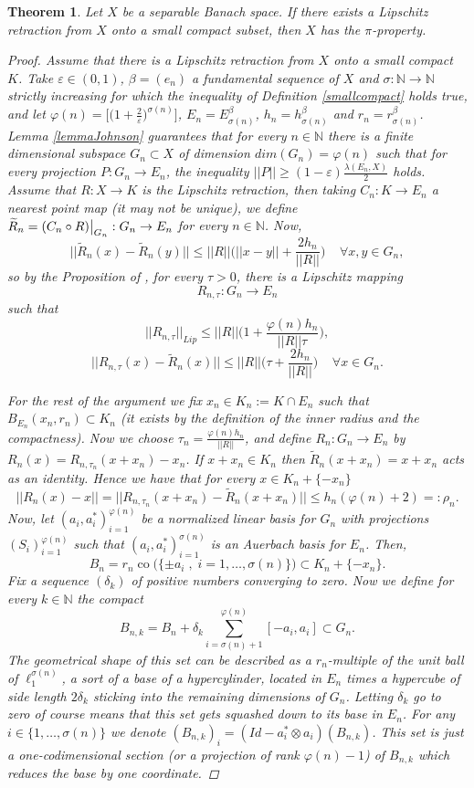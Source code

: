 \documentclass[11pt]{amsart}
\newcommand{\ep}{\varepsilon}
\newcommand{\N}{\mathbb{N}}
\newcommand\restr[2]{{%
  \left.\kern-\nulldelimiterspace %
  #1 %
  \vphantom{\big|} %
  \right|_{#2} %
  }}
\DeclareMathOperator{\co}{co}
\newcommand{\<}{\langle}
\renewcommand{\>}{\rangle}
\newtheorem{theorem}{Theorem}[section]
\theoremstyle{definition}
\theoremstyle{remark}
\numberwithin{equation}{section}
\begin{document}
\begin{theorem}\label{theosmall}
Let $X$ be a separable Banach space. If there exists a Lipschitz retraction from $X$ onto a small compact subset, then $X$ has the $\pi$-property.
\begin{proof}
Assume that there is a Lipschitz retraction from $X$ onto a small compact $K$. Take $\ep\in(0,1)$, $\beta=(e_n)$ a fundamental sequence of $X$ and $\sigma:\N\rightarrow\N$ strictly increasing for which the inequality of Definition \ref{smallcompact} holds true, and let $\varphi(n)=\Big[\big(1+\frac{2}{\ep}\big)^{\sigma(n)}\Big]$, $E_n=E_{\sigma(n)}^\beta$, $h_n=h_{\sigma(n)}^\beta$ and $r_n=r_{\sigma(n)}^\beta$. Lemma \ref{lemmaJohnson} guarantees that for every $n\in\N$ there is a finite dimensional subspace $G_n\subset X$ of dimension $dim(G_n)=\varphi(n)$ such that for every projection $P: G_n\rightarrow E_n$, the inequality $||P||\ge (1-\ep)\frac{\lambda(E_n,X)}{2}$ holds. Assume that $R:X\rightarrow K$ is the Lipschitz retraction, then taking $C_n:K\rightarrow E_n$ a nearest point map (it may not be unique), we define $\widetilde{R}_n=\restr{(C_n\circ R)}{G_{n}}:G_{n}\rightarrow E_n$ for every $n\in\N$. Now,
$$||\widetilde{R}_n(x)-\widetilde{R}_n(y)||\le ||R||\bigg( ||x-y||+\frac{2h_{n}}{||R||} \bigg)\;\;\;\;\forall x,y\in G_{n},$$
so by the Proposition of \cite{B99}, for every $\tau>0$, there is a Lipschitz mapping 
$$R_{n,\tau}:G_{n}\rightarrow E_n$$
such that
$$||R_{n,\tau}||_{Lip}\le||R||\bigg( 1+\frac{\varphi(n)h_{n}}{||R||\tau} \bigg),$$
$$||R_{n,\tau}(x)-\widetilde{R}_n(x)||\le||R||\bigg( \tau+\frac{2h_{n}}{||R||} \bigg)\;\;\;\;\forall x\in G_{n}.$$

For the rest of the argument we fix  $x_n\in K_n:=K\cap E_n$ such that $B_{E_n}(x_n,r_n)\subset K_n$ (it exists by the definition of the inner radius and the compactness).
Now we choose $\tau_n=\frac{\varphi(n)h_{n}}{||R||}$, and define $R_n:G_n\rightarrow E_n$ by $R_n(x)=R_{n,\tau_n}(x+x_n)-x_n$. 
If $x+x_n\in K_n$ then $\widetilde{R}_n(x+x_n)=x+x_n$ acts as an identity.
Hence we have that for every $x\in K_n+\{-x_n\}$
$$||R_n(x)-x||=||R_{n,\tau_n}(x+x_n)-\widetilde{R}_n(x+x_n)||\le h_{n}(\varphi(n)+2)=:\rho_n.$$
Now, let $(a_i,a_i^*)_{i=1}^{\varphi(n)}$ be a normalized linear basis for $G_n$ with projections $(S_i)_{i=1}^{\varphi(n)}$ such that $(a_i,a_i^*)_{i=1}^{\sigma(n)}$ is an Auerbach basis for $E_n$. Then, 
$$B_n=r_n\co\big(\{\pm a_i\;,\;i=1,\dots,\sigma(n)\}\big)\subset K_n+\{-x_n\}.$$
Fix a sequence $(\delta_k)$ of positive numbers converging to zero. Now we define for every $k\in\N$ the compact
$$B_{n,k}=B_n+\delta_k\sum\limits_{i=\sigma(n)+1}^{\varphi(n)}[-a_i,a_i]\subset G_n.$$
The geometrical shape of this set can be described as a $r_n$-multiple of the unit ball of $\ell_1^{\sigma(n)}$, a sort of a base of a hypercylinder, located in $E_n$ times a hypercube of side length $2\delta_k$ sticking into the remaining dimensions of $G_n$.
Letting $\delta_k$ go to zero of course means that this set gets squashed down to its base in $E_n$.
For any $i\in\{1,\dots,\sigma(n)\}$ we denote $(B_{n,k})_i=(Id-a_i^*\otimes a_i)(B_{n,k})$. This set is just a one-codimensional section (or a projection of rank $\varphi(n)-1$) of $B_{n,k}$ which reduces the base by one coordinate.


\end{proof}
\end{theorem}
\end{document}
